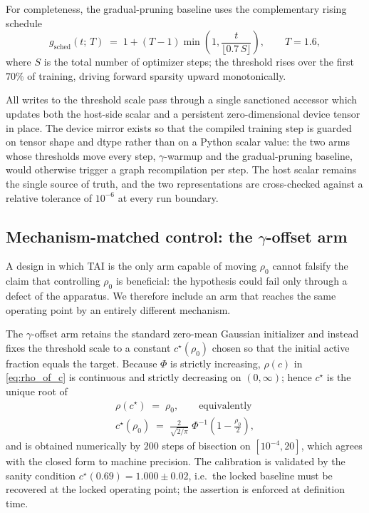 \documentclass[final,5p,times,twocolumn]{elsarticle}
\theoremstyle{remark}
\newcommand{\rhoz}{\rho_{0}}
\begin{document}
For completeness, the gradual-pruning baseline uses the complementary
rising schedule
\begin{equation}
\label{eq:gammasched}
g_{\mathrm{sched}}(t;\,T) \;=\; 1 + (T-1)\min\!\left(1,
\frac{t}{\lfloor 0.7\,S\rfloor}\right),
\qquad T = 1.6,
\end{equation}
where $S$ is the total number of optimizer steps; the threshold rises over the
first $70\%$ of training, driving forward sparsity upward monotonically.

All writes to the threshold scale pass through a single sanctioned accessor
which updates both the host-side scalar and a persistent zero-dimensional
device tensor in place. The device mirror exists so that the compiled training
step is guarded on tensor shape and dtype rather than on a Python scalar value:
the two arms whose thresholds move every step, $\gamma$-warmup and the
gradual-pruning baseline, would otherwise trigger a graph recompilation per
step. The host scalar remains the single source of truth, and the two
representations are cross-checked against a relative tolerance of $10^{-6}$ at
every run boundary.

\subsection{Mechanism-matched control: the $\gamma$-offset arm}
\label{sec:gammaoffset}

A design in which TAI is the only arm capable of moving $\rhoz$ cannot falsify
the claim that controlling $\rhoz$ is beneficial: the hypothesis could fail only
through a defect of the apparatus. We therefore include an arm that reaches the
same operating point by an entirely different mechanism.

The $\gamma$-offset arm retains the standard zero-mean Gaussian initializer and
instead fixes the threshold scale to a constant $c^{\star}(\rhoz)$ chosen so
that the initial active fraction equals the target. Because $\Phi$ is
strictly increasing, $\rho(c)$ in \eqref{eq:rho_of_c} is continuous and
strictly decreasing on $(0,\infty)$; hence $c^{\star}$ is the unique root of
\begin{equation}
\label{eq:cstar}
\begin{gathered}
\rho(c^{\star}) \;=\; \rhoz,
\qquad\text{equivalently}\\[0.6ex]
c^{\star}(\rhoz) \;=\; \frac{2}{\sqrt{2/\pi}}\;
\Phi^{-1}\!\left(1-\frac{\rhoz}{2}\right),
\end{gathered}
\end{equation}
and is obtained numerically by $200$ steps of bisection on $[10^{-4}, 20]$,
which agrees with the closed form to machine precision. The calibration is validated by the
sanity condition $c^{\star}(0.69) = 1.000 \pm 0.02$, i.e.\ the locked baseline
must be recovered at the locked operating point; the assertion is enforced at
definition time.
\end{document}
